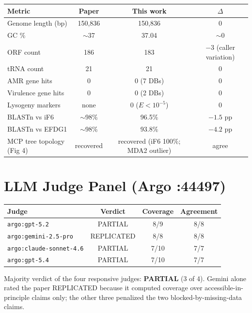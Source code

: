 \documentclass[11pt,letterpaper]{article}
\begin{document}
\begin{center}
\small
\begin{tabular}{lccc}
\toprule
Metric & Paper & This work & $\Delta$\\
\midrule
Genome length (bp)        & 150{,}836 & 150{,}836 & 0 \\
GC \%                     & $\sim$37   & 37.04    & $\sim$0 \\
ORF count                 & 186       & 183       & $-3$ (caller variation) \\
tRNA count                & 21        & 21        & 0 \\
AMR gene hits             & 0         & 0 (7 DBs) & 0 \\
Virulence gene hits       & 0         & 0 (2 DBs) & 0 \\
Lysogeny markers          & none      & 0 ($E<10^{-5}$) & 0 \\
BLASTn vs iF6             & $\sim$98\% & 96.5\%    & $-1.5$ pp \\
BLASTn vs EFDG1           & $\sim$98\% & 93.8\%    & $-4.2$ pp \\
MCP tree topology (Fig 4) & recovered & recovered (iF6 100\%; MDA2 outlier) & agree \\
\bottomrule
\end{tabular}
\end{center}

\section{LLM Judge Panel (Argo :44497)}

\begin{center}
\begin{tabular}{lccc}
\toprule
Judge & Verdict & Coverage & Agreement \\
\midrule
\texttt{argo:gpt-5.2}            & PARTIAL    & 8/9  & 8/8 \\
\texttt{argo:gemini-2.5-pro}     & REPLICATED & 8/8  & 8/8 \\
\texttt{argo:claude-sonnet-4.6}  & PARTIAL    & 7/10 & 7/7 \\
\texttt{argo:gpt-5.4}            & PARTIAL    & 7/10 & 7/7 \\
\bottomrule
\end{tabular}
\end{center}

Majority verdict of the four responsive judges: \textbf{PARTIAL} (3 of 4). Gemini alone rated the paper REPLICATED because it computed coverage over accessible-in-principle claims only; the other three penalized the two blocked-by-missing-data claims.
\end{document}
